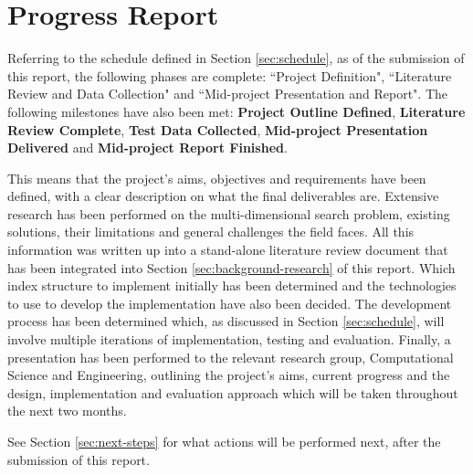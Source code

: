 \section{Progress Report}

Referring to the schedule defined in Section \ref{sec:schedule}, as of the submission of this report, the following phases are complete: ``Project Definition", ``Literature Review and Data Collection" and ``Mid-project Presentation and Report". The following milestones have also been met: \textbf{Project Outline Defined}, \textbf{Literature Review Complete},  \textbf{Test Data Collected}, \textbf{Mid-project Presentation Delivered} and \textbf{Mid-project Report Finished}. 

This means that the project's aims, objectives and requirements have been defined, with a clear description on what the final deliverables are. Extensive research has been performed on the multi-dimensional search problem, existing solutions, their limitations and general challenges the field faces. All this information was written up into a stand-alone literature review document that has been integrated into Section \ref{sec:background-research} of this report. Which index structure to implement initially has been determined and the technologies to use to develop the implementation have also been decided. The development process has been determined which, as discussed in Section \ref{sec:schedule}, will involve multiple iterations of implementation, testing and evaluation. Finally, a presentation has been performed to the relevant research group, Computational Science and Engineering, outlining the project's aims, current progress and the design, implementation and evaluation approach which will be taken throughout the next two months.

See Section \ref{sec:next-steps} for what actions will be performed next, after the submission of this report.
